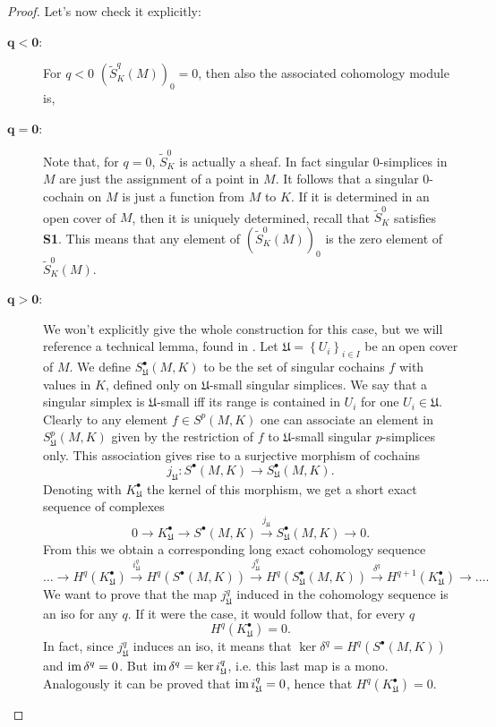 \begin{proof}
	Let's now check it explicitly:
	\begin{description}
		\item[$\mathbf{q < 0}$:] For $q < 0$ $(\widetilde{S}^q_K(M))_0 = 0$, then also the associated cohomology module is,
		\item[$\mathbf{q = 0}$:] Note that, for $q =0$, $\widetilde{S}^0_K$ is actually a sheaf.
			In fact singular $0$-simplices in $M$ are just the assignment of a point in $M$.
			It follows that a singular $0$-cochain on $M$ is just a function from $M$ to $K$.
			If it is determined in an open cover of $M$, then it is uniquely determined, recall that $\widetilde{S}^0_K$ satisfies \textbf{S1}.
			This means that any element of $(\widetilde{S}^0_K(M))_0$ is the zero element of $\widetilde{S}^0_K(M)$.
		\item[$\mathbf{q>0}$:] We won't explicitly give the whole construction for this case, but we will reference a technical lemma, found in \cite{warner}.
			Let $\mathfrak{U} = \left\{ U_i \right\}_{i \in I}$ be an open cover of $M$.
			We define $S^\bullet_\mathfrak{U}(M,K)$ to be the set of singular cochains $f$ with values in $K$, defined only on $\mathfrak{U}$-small singular simplices.
			We say that a singular simplex is $\mathfrak{U}$-small iff its range is contained in $U_i$ for one $U_i \in \mathfrak{U}$.
			Clearly to any element $f \in S^p(M,K)$ one can associate an element in $S^p_\mathfrak{U}(M,K)$ given by the restriction of $f$ to $\mathfrak{U}$-small singular $p$-simplices only.
			This association gives rise to a surjective morphism of cochains
			\begin{equation}
				j_\mathfrak{U}: S^\bullet(M,K) \to S^\bullet_\mathfrak{U}(M,K)
			.\end{equation} 
			Denoting with $K_\mathfrak{U}^\bullet$ the kernel of this morphism, we get a short exact sequence of complexes
			\begin{equation}
				0\to K^\bullet_\mathfrak{U} \xrightarrow{} S^\bullet(M,K) \xrightarrow{j_\mathfrak{U}} S_\mathfrak{U}^\bullet(M,K) \to 0
			.\end{equation}
			From this we obtain a corresponding long exact cohomology sequence
			\begin{equation}
				\dots \to H^q(K^\bullet_\mathfrak{U}) \xrightarrow{i_\mathfrak{U}^q}  H^q(S^\bullet(M,K)) \xrightarrow{j_\mathfrak{U}^q}
				H^q(S^\bullet_\mathfrak{U}(M,K)) \xrightarrow{\delta^q} H^{q+1}(K^\bullet_\mathfrak{U}) \to \dots
			.\end{equation} 
			We want to prove that the map $j_\mathfrak{U}^q$ induced in the cohomology sequence is an iso for any $q$.
			If it were the case, it would follow that, for every $q$
			\begin{equation}\label{eqn:0cohomology}
				H^q(K^\bullet_\mathfrak{U}) = 0
			.\end{equation} 
			In fact, since $j_\mathfrak{U}^q$ induces an iso, it means that $\ker \delta^q = H^q(S^\bullet(M,K))$ and $\operatorname{im} \delta^q = 0$. 
			But $\operatorname{im} \delta^q = \ker i_\mathfrak{U}^q$, i.e. this last map is a mono.
			Analogously it can be proved that $\operatorname{im} i^q_\mathfrak{U} = 0$, hence that $H^q(K^\bullet_\mathfrak{U}) = 0$.


\end{description}
\end{proof}
